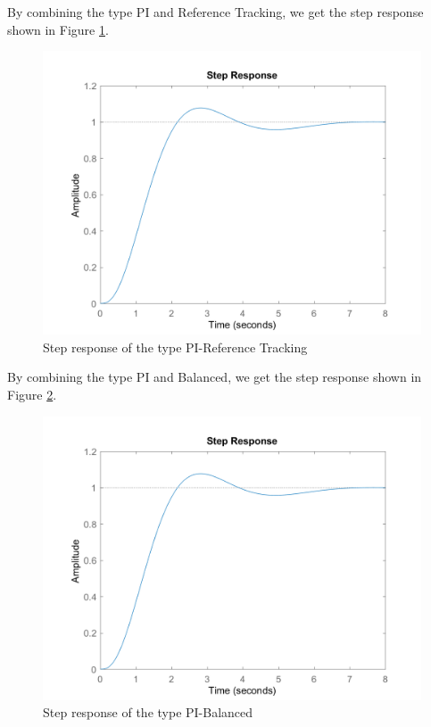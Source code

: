 \documentclass[a4paper, twocolumn, titlepage, 10pt]{article}
\begin{document}
		By combining the type PI and Reference Tracking, we get the step response shown in Figure \ref{PI-track-step}.
		\begin{figure}[H]
			\centering
			\includegraphics[width=\linewidth]{PI-track-step}
			\caption{Step response of the type PI-Reference Tracking}
			\label{PI-track-step}
		\end{figure}
		By combining the type PI and Balanced, we get the step response shown in Figure \ref{PI-balance-step}.
		\begin{figure}[H]
			\centering
			\includegraphics[width=\linewidth]{PI-balance-step}
			\caption{Step response of the type PI-Balanced}
			\label{PI-balance-step}	
		\end{figure}
\end{document}
